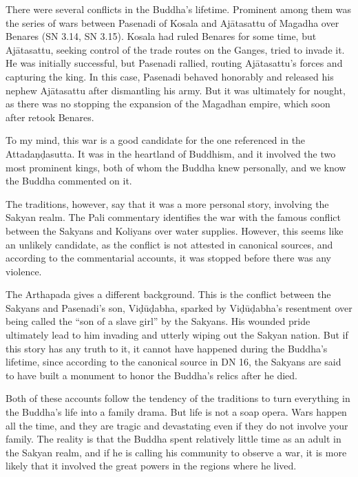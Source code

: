 \documentclass[12pt,openany]{book}%
\begin{document}
There were several conflicts in the Buddha’s lifetime. Prominent among them was the series of wars between Pasenadi of Kosala and \textsanskrit{Ajātasattu} of Magadha over Benares (SN 3.14, SN 3.15). Kosala had ruled Benares for some time, but \textsanskrit{Ajātasattu}, seeking control of the trade routes on the Ganges, tried to invade it. He was initially successful, but Pasenadi rallied, routing \textsanskrit{Ajātasattu}’s forces and capturing the king. In this case, Pasenadi behaved honorably and released his nephew \textsanskrit{Ajātasattu} after dismantling his army. But it was ultimately for nought, as there was no stopping the expansion of the Magadhan empire, which soon after retook Benares.

To my mind, this war is a good candidate for the one referenced in the \textsanskrit{Attadaṇḍasutta}. It was in the heartland of Buddhism, and it involved the two most prominent kings, both of whom the Buddha knew personally, and we know the Buddha commented on it.

The traditions, however, say that it was a more personal story, involving the Sakyan realm. The Pali commentary identifies the war with the famous conflict between the Sakyans and Koliyans over water supplies. However, this seems like an unlikely candidate, as the conflict is not attested in canonical sources, and according to the commentarial accounts, it was stopped before there was any violence.

The Arthapada gives a different background. This is the conflict between the Sakyans and Pasenadi’s son, \textsanskrit{Viḍūḍabha}, sparked by \textsanskrit{Viḍūḍabha}’s resentment over being called the “son of a slave girl” by the Sakyans. His wounded pride ultimately lead to him invading and utterly wiping out the Sakyan nation. But if this story has any truth to it, it cannot have happened during the Buddha’s lifetime, since according to the canonical source in DN 16, the Sakyans are said to have built a monument to honor the Buddha’s relics after he died.

Both of these accounts follow the tendency of the traditions to turn everything in the Buddha’s life into a family drama. But life is not a soap opera. Wars happen all the time, and they are tragic and devastating even if they do not involve your family. The reality is that the Buddha spent relatively little time as an adult in the Sakyan realm, and if he is calling his community to observe a war, it is more likely that it involved the great powers in the regions where he lived.
\end{document}
